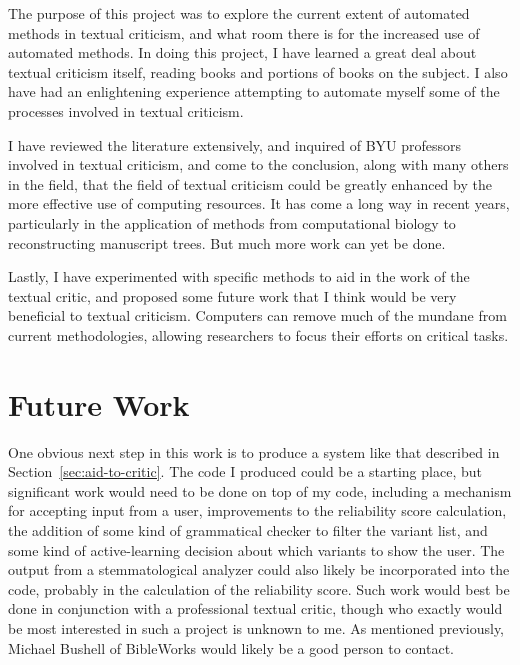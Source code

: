 \documentclass[onecolumn, 12pt]{article}
\newcommand{\secref}[1]{Section~\ref{sec:#1}}
\begin{document}
The purpose of this project was to explore the current extent of automated
methods in textual criticism, and what room there is for the increased use of
automated methods.  In doing this project, I have learned a great deal about
textual criticism itself, reading books and portions of books on the subject.
I also have had an enlightening experience attempting to automate myself some
of the processes involved in textual criticism.

I have reviewed the literature extensively, and inquired of BYU professors
involved in textual criticism, and come to the conclusion, along with many
others in the field, that the field of textual criticism could be greatly
enhanced by the more effective use of computing resources.  It has come a long
way in recent years, particularly in the application of methods from
computational biology to reconstructing manuscript trees.  But much more work
can yet be done.

Lastly, I have experimented with specific methods to aid in the work of the
textual critic, and proposed some future work that I think would be very
beneficial to textual criticism.  Computers can remove much of the mundane from
current methodologies, allowing researchers to focus their efforts on critical
tasks.

\section{Future Work}

One obvious next step in this work is to produce a system like that described
in \secref{aid-to-critic}.  The code I produced could be a starting place, but
significant work would need to be done on top of my code, including a mechanism
for accepting input from a user, improvements to the reliability score
calculation, the addition of some kind of grammatical checker to filter the
variant list, and some kind of active-learning decision about which variants to
show the user.  The output from a stemmatological analyzer could also likely be
incorporated into the code, probably in the calculation of the reliability
score.  Such work would best be done in conjunction with a professional textual
critic, though who exactly would be most interested in such a project is
unknown to me.  As mentioned previously, Michael Bushell of BibleWorks would
likely be a good person to contact.
\end{document}
